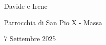 

  \begin{center}

  \vspace{1cm}

  {\brittany\LARGE Davide e Irene}

  \vspace{0.5cm}


  \vspace{0.5cm}

  {\Large Parrocchia di San Pio X - Massa}

  \vspace{0.5cm}

  {\Large 7 Settembre 2025}
  \end{center}

  \thispagestyle{empty}

\newpage
